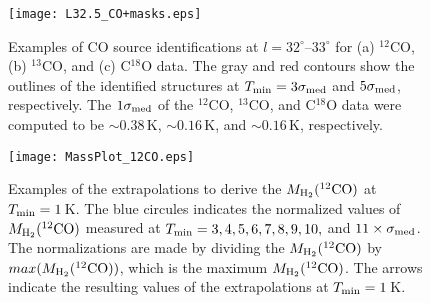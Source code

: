 \documentclass[proof]{pasj01}
\newcommand{\mtwo}{M_{\rm H_2}{\rm (^{12}CO)}}
\begin{document}
\begin{figure}
 \begin{center}
  \texttt{[image: L32.5\_CO+masks.eps]}
 \end{center}
 \caption{Examples of CO source identifications at $l=32^\circ$--$33^\circ$ for (a) $^{12}$CO, (b) $^{13}$CO, and (c) C$^{18}$O data. The gray and red contours show the outlines of the identified structures at $T_{\rm min} = 3\sigma_{\rm med}$ and $5\sigma_{\rm med}$, respectively. The $1\sigma_{\rm med}$ of the $^{12}$CO, $^{13}$CO, and C$^{18}$O data were computed to be $\sim0.38$\,K, $\sim0.16$\,K, and $\sim0.16$\,K, respectively.}\label{fig:mask}
\end{figure}

\begin{figure}
 \begin{center}
  \texttt{[image: MassPlot\_12CO.eps]}
 \end{center}
 \caption{Examples of the extrapolations to derive the $\mtwo$ at $T_{\rm min} = 1$\,K. The blue circules indicates the normalized values of $\mtwo$ measured at $T_{\rm min} = 3, 4, 5, 6, 7, 8, 9, 10,$ and  $11 \times \sigma_{\rm med}$. The normalizations are made by dividing the $\mtwo$ by $max(M_{\rm H_2}{\rm (^{12}CO)})$, which is the maximum $\mtwo$. The arrows indicate the resulting values of the extrapolations at $T_{\rm min} = 1$\,K. }\label{fig:expol}
\end{figure}
\end{document}
